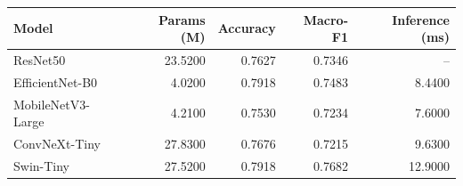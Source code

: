 \begin{tabular}{lrrrr}
\toprule
Model & Params (M) & Accuracy & Macro-F1 & Inference (ms) \\
\midrule
ResNet50 & 23.5200 & 0.7627 & 0.7346 & -- \\
EfficientNet-B0 & 4.0200 & 0.7918 & 0.7483 & 8.4400 \\
MobileNetV3-Large & 4.2100 & 0.7530 & 0.7234 & 7.6000 \\
ConvNeXt-Tiny & 27.8300 & 0.7676 & 0.7215 & 9.6300 \\
Swin-Tiny & 27.5200 & 0.7918 & 0.7682 & 12.9000 \\
\bottomrule
\end{tabular}
